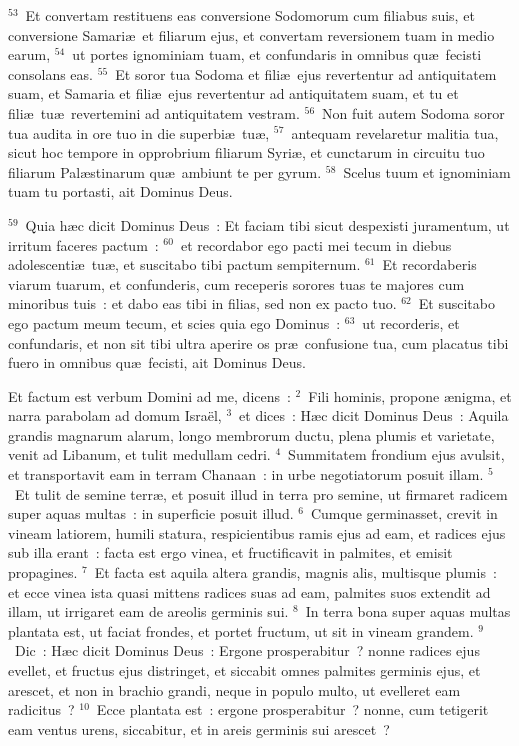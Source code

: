 ${}^{53}$~Et convertam restituens eas conversione Sodomorum cum filiabus suis, et conversione Samari\ae\ et filiarum ejus, et convertam reversionem tuam in medio earum,
${}^{54}$~ut portes ignominiam tuam, et confundaris in omnibus qu\ae\ fecisti consolans eas.
${}^{55}$~Et soror tua Sodoma et fili\ae\ ejus revertentur ad antiquitatem suam, et Samaria et fili\ae\ ejus revertentur ad antiquitatem suam, et tu et fili\ae\ tu\ae\ revertemini ad antiquitatem vestram.
${}^{56}$~Non fuit autem Sodoma soror tua audita in ore tuo in die superbi\ae\ tu\ae ,
${}^{57}$~antequam revelaretur malitia tua, sicut hoc tempore in opprobrium filiarum Syri\ae , et cunctarum in circuitu tuo filiarum Pal\ae stinarum qu\ae\ ambiunt te per gyrum.
${}^{58}$~Scelus tuum et ignominiam tuam tu portasti, ait Dominus Deus.


${}^{59}$~Quia h\ae c dicit Dominus Deus~: Et faciam tibi sicut despexisti juramentum, ut irritum faceres pactum~:
${}^{60}$~et recordabor ego pacti mei tecum in diebus adolescenti\ae\ tu\ae , et suscitabo tibi pactum sempiternum.
${}^{61}$~Et recordaberis viarum tuarum, et confunderis, cum receperis sorores tuas te majores cum minoribus tuis~: et dabo eas tibi in filias, sed non ex pacto tuo.
${}^{62}$~Et suscitabo ego pactum meum tecum, et scies quia ego Dominus~:
${}^{63}$~ut recorderis, et confundaris, et non sit tibi ultra aperire os pr\ae\ confusione tua, cum placatus tibi fuero in omnibus qu\ae\ fecisti, ait Dominus Deus.

\lettrine[lines=10,image=true,loversize=0.05,lraise=-0.03]{E}{}t factum est verbum Domini ad me, dicens~:
${}^{2}$~Fili hominis, propone \ae nigma, et narra parabolam ad domum Isra\"el,
${}^{3}$~et dices~: H\ae c dicit Dominus Deus~: Aquila grandis magnarum alarum, longo membrorum ductu, plena plumis et varietate, venit ad Libanum, et tulit medullam cedri.
${}^{4}$~Summitatem frondium ejus avulsit, et transportavit eam in terram Chanaan~: in urbe negotiatorum posuit illam.
${}^{5}$~Et tulit de semine terr\ae , et posuit illud in terra pro semine, ut firmaret radicem super aquas multas~: in superficie posuit illud.
${}^{6}$~Cumque germinasset, crevit in vineam latiorem, humili statura, respicientibus ramis ejus ad eam, et radices ejus sub illa erant~: facta est ergo vinea, et fructificavit in palmites, et emisit propagines.
${}^{7}$~Et facta est aquila altera grandis, magnis alis, multisque plumis~: et ecce vinea ista quasi mittens radices suas ad eam, palmites suos extendit ad illam, ut irrigaret eam de areolis germinis sui.
${}^{8}$~In terra bona super aquas multas plantata est, ut faciat frondes, et portet fructum, ut sit in vineam grandem.
${}^{9}$~Dic~: H\ae c dicit Dominus Deus~: Ergone prosperabitur~? nonne radices ejus evellet, et fructus ejus distringet, et siccabit omnes palmites germinis ejus, et arescet, et non in brachio grandi, neque in populo multo, ut evelleret eam radicitus~?
${}^{10}$~Ecce plantata est~: ergone prosperabitur~? nonne, cum tetigerit eam ventus urens, siccabitur, et in areis germinis sui arescet~?



